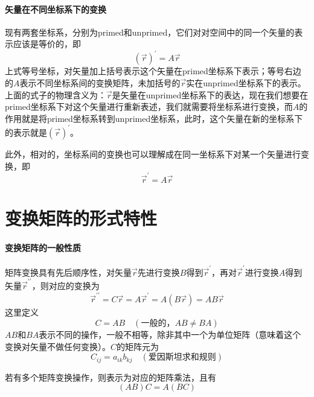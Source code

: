 \paragraph*{矢量在不同坐标系下的变换}
现有两套坐标系，分别为primed和unprimed，它们对对空间中的同一个矢量的表示应该是等价的，即
\begin{equation}
	(\vec{r})^{\prime} = A \vec{r}
\end{equation}
上式等号坐标，对矢量加上括号表示这个矢量在primed坐标系下表示；等号右边的$A$表示不同坐标系间的变换矩阵，未加括号的$\vec{r}$实在unprimed坐标系下的表示。上面的式子的物理含义为：$\vec{r}$是矢量在unprimed坐标系下的表达，现在我们想要在primed坐标系下对这个矢量进行重新表述，我们就需要将坐标系进行变换，而$A$的作用就是将primed坐标系转到unprimed坐标系，此时，这个矢量在新的坐标系下的表示就是$(\vec{r})^{\prime}$。

此外，相对的，坐标系间的变换也可以理解成在同一坐标系下对某一个矢量进行变换，即
\begin{equation}
	\vec{r}^{\prime} = A \vec{r}
\end{equation}

\section{变换矩阵的形式特性}
\paragraph*{变换矩阵的一般性质}
矩阵变换具有先后顺序性，对矢量$\vec{r}$先进行变换$B$得到$\vec{r}^{\prime}$，再对$\vec{r}^{\prime}$进行变换$A$得到矢量$\vec{r}^{\prime\prime}$，则对应的变换为
\begin{equation}
	\vec{r}^{\prime\prime} = C\vec{r} = A\vec{r}^{\prime} = A(B\vec{r}) = AB\vec{r}
\end{equation}
这里定义
\begin{equation}
	C = AB \quad (\text{一般的，}AB\neq BA)
\end{equation}
$AB$和$BA$表示不同的操作，一般不相等，除非其中一个为单位矩阵（意味着这个变换对矢量不做任何变换）。$C$的矩阵元为
\begin{equation}
	C_{ij} = a_{ik}b_{kj} \quad (\text{爱因斯坦求和规则})
\end{equation}

若有多个矩阵变换操作，则表示为对应的矩阵乘法，且有
\begin{equation}
	(AB)C = A(BC)
\end{equation}


